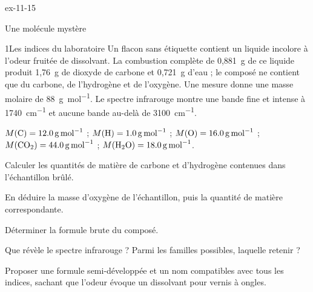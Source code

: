 \begin{blocLivre}{ex-11-15}
\begin{exercice}[3]{Une molécule mystère}
\begin{docu}{1}{Les indices du laboratoire}
Un flacon sans étiquette contient un liquide incolore à l'odeur fruitée de dissolvant. La combustion complète de
0,881~g de ce liquide produit 1,76~g de dioxyde de carbone et 0,721~g d'eau ; le composé ne contient que du carbone,
de l'hydrogène et de l'oxygène. Une mesure donne une masse molaire de \qty{88}{g.mol^{-1}}. Le spectre infrarouge
montre une bande fine et intense à \qty{1740}{cm^{-1}} et aucune bande au-delà de \qty{3100}{cm^{-1}}.
\end{docu}
\begin{donnees}
$M(\ce{C})=\qty{12,0}{g.mol^{-1}}$ ; $M(\ce{H})=\qty{1,0}{g.mol^{-1}}$ ; $M(\ce{O})=\qty{16,0}{g.mol^{-1}}$ ;
$M(\ce{CO2})=\qty{44,0}{g.mol^{-1}}$ ; $M(\ce{H2O})=\qty{18,0}{g.mol^{-1}}$.
\end{donnees}
\begin{questions}
\item Calculer les quantités de matière de carbone et d'hydrogène contenues dans l'échantillon brûlé.
\item En déduire la masse d'oxygène de l'échantillon, puis la quantité de matière correspondante.
\item \initiative Déterminer la formule brute du composé.
\item Que révèle le spectre infrarouge ? Parmi les familles possibles, laquelle retenir ?
\item Proposer une formule semi-développée et un nom compatibles avec tous les indices, sachant que l'odeur évoque un
dissolvant pour vernis à ongles.
\end{questions}
\end{exercice}
\end{blocLivre}
